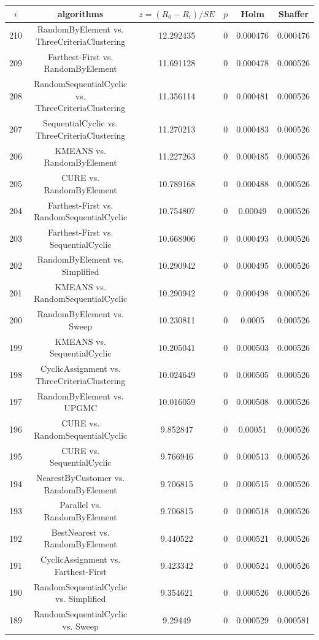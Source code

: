 \documentclass[a4paper,10pt]{article}
\begin{document}
\begin{landscape}
\begin{table}[!htp]
\centering\scriptsize
\begin{tabular}{cccccc}
$i$&algorithms&$z=(R_0 - R_i)/SE$&$p$&Holm&Shaffer\\
\hline210&RandomByElement vs. ThreeCriteriaClustering&12.292435&0&0.000476&0.000476\\
209&Farthest-First vs. RandomByElement&11.691128&0&0.000478&0.000526\\
208&RandomSequentialCyclic vs. ThreeCriteriaClustering&11.356114&0&0.000481&0.000526\\
207&SequentialCyclic vs. ThreeCriteriaClustering&11.270213&0&0.000483&0.000526\\
206&KMEANS vs. RandomByElement&11.227263&0&0.000485&0.000526\\
205&CURE vs. RandomByElement&10.789168&0&0.000488&0.000526\\
204&Farthest-First vs. RandomSequentialCyclic&10.754807&0&0.00049&0.000526\\
203&Farthest-First vs. SequentialCyclic&10.668906&0&0.000493&0.000526\\
202&RandomByElement vs. Simplified&10.290942&0&0.000495&0.000526\\
201&KMEANS vs. RandomSequentialCyclic&10.290942&0&0.000498&0.000526\\
200&RandomByElement vs. Sweep&10.230811&0&0.0005&0.000526\\
199&KMEANS vs. SequentialCyclic&10.205041&0&0.000503&0.000526\\
198&CyclicAssignment vs. ThreeCriteriaClustering&10.024649&0&0.000505&0.000526\\
197&RandomByElement vs. UPGMC&10.016059&0&0.000508&0.000526\\
196&CURE vs. RandomSequentialCyclic&9.852847&0&0.00051&0.000526\\
195&CURE vs. SequentialCyclic&9.766946&0&0.000513&0.000526\\
194&NearestByCustomer vs. RandomByElement&9.706815&0&0.000515&0.000526\\
193&Parallel vs. RandomByElement&9.706815&0&0.000518&0.000526\\
192&BestNearest vs. RandomByElement&9.440522&0&0.000521&0.000526\\
191&CyclicAssignment vs. Farthest-First&9.423342&0&0.000524&0.000526\\
190&RandomSequentialCyclic vs. Simplified&9.354621&0&0.000526&0.000526\\
189&RandomSequentialCyclic vs. Sweep&9.29449&0&0.000529&0.000581\\

\end{tabular}
\end{table}
\end{landscape}
\end{document}
